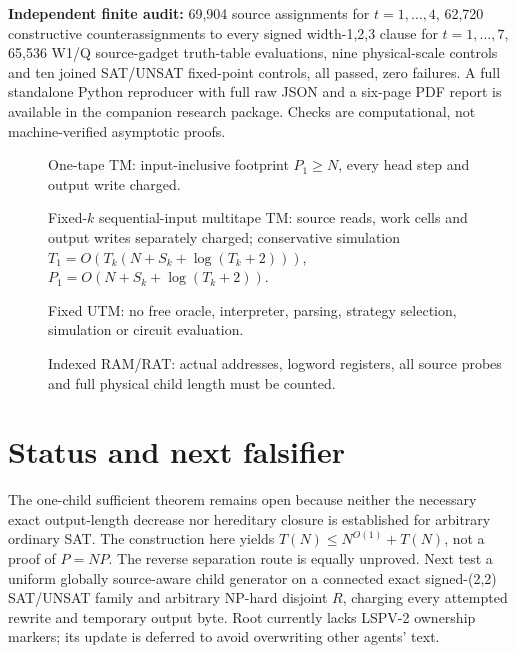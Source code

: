 \documentclass[11pt]{article}
\begin{document}
\noindent\textbf{Independent finite audit:} 69,904 source assignments
for \(t=1,\ldots,4\), 62,720 constructive counterassignments to
every signed width-1,2,3 clause for \(t=1,\ldots,7\),
65,536 W1/Q source-gadget truth-table evaluations,
nine physical-scale controls and ten joined SAT/UNSAT fixed-point
controls, all passed, zero failures. A full standalone Python
reproducer with full raw JSON and a six-page PDF report is
available in the companion research package.
Checks are computational, not machine-verified asymptotic proofs.

\begin{description}
\item[] One-tape TM: input-inclusive footprint \(P_1\ge N\),
every head step and output write charged.
\item[] Fixed-\(k\) sequential-input multitape TM: source
reads, work cells and output writes separately charged;
conservative simulation \(T_1=O(T_k(N+S_k+\log(T_k+2)))\),
\(P_1=O(N+S_k+\log(T_k+2))\).
\item[] Fixed UTM: no free oracle, interpreter, parsing,
strategy selection, simulation or circuit evaluation.
\item[] Indexed RAM/RAT: actual addresses, logword registers,
all source probes and full physical child length must be counted.
\end{description}

\section{Status and next falsifier}
The one-child sufficient theorem remains open because neither the
necessary exact output-length decrease nor hereditary closure is
established for arbitrary ordinary SAT. The construction here yields
\(T(N)\le N^{O(1)}+T(N)\), not a proof of \(P=NP\).
The reverse separation route is equally unproved. Next test a
uniform globally source-aware child generator on a connected exact
signed-(2,2) SAT/UNSAT family and arbitrary NP-hard disjoint \(R\),
charging every attempted rewrite and temporary output byte.
Root  currently lacks LSPV-2 ownership markers;
its update is deferred to avoid overwriting other agents' text.
\end{document}

